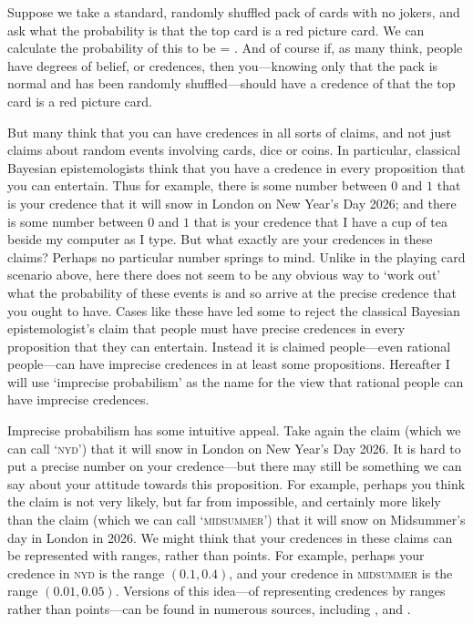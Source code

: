Suppose we take a standard, randomly shuffled pack of cards with no jokers, and ask what the probability is that the top card is a red picture card. We can calculate the probability of this to be  = . And of course if, as many think, people have degrees of belief, or credences, then you---knowing only that the pack is normal and has been randomly shuffled---should have a credence of  that the top card is a red picture card.

But many think that you can have credences in all sorts of claims, and not just claims about random events involving cards, dice or coins. In particular, classical Bayesian epistemologists think that you have a credence in every proposition that you can entertain. Thus for example, there is some number between $0$ and $1$ that is your credence that it will snow in London on New Year's Day 2026; and there is some number between $0$ and $1$ that is your credence that I have a cup of tea beside my computer as I type. But what exactly are your credences in these claims? Perhaps no particular number springs to mind. Unlike in the playing card scenario above, here there does not seem to be any obvious way to `work out' what the probability of these events is and so arrive at the precise credence that you ought to have. Cases like these have led some to reject the classical Bayesian epistemologist's claim that people must have precise credences in every proposition that they can entertain. Instead it is claimed people---even rational people---can have imprecise credences in at least some propositions. Hereafter I will use `imprecise probabilism' as the name for the view that rational people can have imprecise credences. 

Imprecise probabilism has some intuitive appeal. Take again the claim (which we can call `\textsc{nyd}') that it will snow in London on New Year's Day 2026. It is hard to put a precise number on your credence---but there may still be something we can say about your attitude towards this proposition. For example, perhaps you think the claim is not very likely, but far from impossible, and certainly more likely than the claim (which we can call `\textsc{midsummer}') that it will snow on Midsummer's day in London in 2026. We might think that your credences in these claims can be represented with ranges, rather than points.  For example, perhaps your credence in \textsc{nyd} is the range $(0.1, 0.4)$, and your credence in \textsc{midsummer} is the range $(0.01, 0.05)$.  Versions of this idea---of representing credences by ranges rather than points---can be found in numerous sources, including \citet{bradley2009,gardenforssahlin1982,jeffrey1983,joyce2005,kaplan1996,keynes1921,kyburg1983,levi1974,sturgeon2008,vanfraassen2006}, and \citet{walley1991}. 

